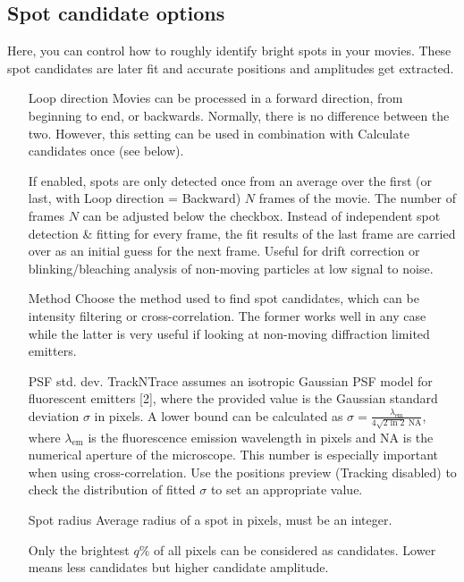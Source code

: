 \documentclass[11pt,onside]{report}
\makeatletter
\numberwithin{equation}{chapter}
\gdef\tshortstack{\@ifnextchar[\@tshortstack{\@tshortstack[c]}}
\gdef\@tshortstack[#1]{%
  \leavevmode
  \vtop\bgroup
    \baselineskip-\p@\lineskip 3\p@
    \let\mb@l\hss\let\mb@r\hss
    \expandafter\let\csname mb@#1\endcsname\relax
    \let\\\@stackcr
    \@ishortstack}
\makeatother
\begin{document}
\subsection*{Spot candidate options}
Here, you can control how to roughly identify bright spots in your movies. These spot candidates are later fit and accurate positions and amplitudes get extracted. 
\begin{itemize}[leftmargin=2cm]
\item[Loop direction] Movies can be processed in a forward direction, from beginning to end, or backwards. Normally, there is no difference between the two. However, this setting can be used in combination with \textsf{Calculate candidates once} (see below).
\item[\smash{\tshortstack[1]{Calculate candi-\\dates once}}] If enabled, spots are only detected once from an average over the first (or last, with \textsf{Loop direction = Backward}) $N$ frames of the movie. The number of frames $N$ can be adjusted below the checkbox. Instead of independent spot detection \& fitting for every frame, the fit results of the last frame are carried over as an initial guess for the next frame. Useful for drift correction or blinking/bleaching analysis of non-moving particles at low signal to noise.
\item[Method] Choose the method used to find spot candidates, which can be intensity filtering or cross-correlation. The former works well in any case while the latter is very useful if looking at non-moving diffraction limited emitters.
\item[PSF std. dev.] TrackNTrace assumes an isotropic Gaussian PSF model for fluorescent emitters [2], where the provided value is the Gaussian standard deviation $\sigma$ in pixels. A lower bound can be calculated as $\sigma = \frac{\lambda_\mathrm{em}}{4\sqrt{2\ln 2}\: \mathrm{NA}}$, where $\lambda_\mathrm{em}$ is the fluorescence emission wavelength in pixels and NA is the numerical aperture of the microscope. This number is especially important when using cross-correlation. Use the positions preview (\textsf{Tracking} disabled) to check the distribution of fitted $\sigma$ to set an appropriate value.
\item[Spot radius] Average radius of a spot in pixels, must be an integer.
\item[\smash{\tshortstack[1]{Percent brightest\\ pixels}}] Only the brightest $q\%$ of all pixels can be considered as candidates. Lower means less candidates but higher candidate amplitude.

\end{itemize}
\end{document}

